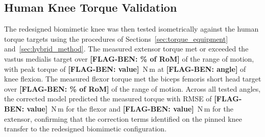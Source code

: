 \subsection{Human Knee Torque Validation}\label{sec:human_torque_validation}


The redesigned biomimetic knee was then tested isometrically against the human torque targets using the procedures of Sections~\ref{sec:torque_equipment} and~\ref{sec:hybrid_method}. The measured extensor torque met or exceeded the vastus medialis target over \textbf{[FLAG-BEN: \% of RoM]} of the range of motion, with peak torque of \textbf{[FLAG-BEN: value]}~N{\,}m at \textbf{[FLAG-BEN: angle]} of knee flexion. The measured flexor torque met the biceps femoris short head target over \textbf{[FLAG-BEN: \% of RoM]} of the range of motion. Across all tested angles, the corrected model predicted the measured torque with RMSE of \textbf{[FLAG-BEN: value]}~N{\,}m for the flexor and \textbf{[FLAG-BEN: value]}~N{\,}m for the extensor, confirming that the correction terms identified on the pinned knee transfer to the redesigned biomimetic configuration.



